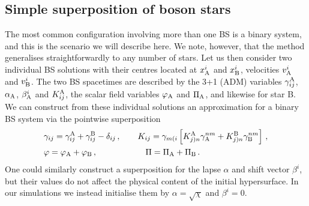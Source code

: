 \documentclass[11pt]{report}  %
\begin{document}
\subsection{Simple superposition of boson stars}
%
\label{sec:superpossimple}
The most common configuration involving more than one BS
is a binary system, and this is the scenario we will
describe here. We note, however, that the method
generalises straightforwardly to any number of stars.
Let us then consider two individual BS solutions
with their centres located at $x^i_{\rm A}$ and $x^i_{\rm B}$,
velocities $v_{\rm A}^i$ and $v_{\rm B}^i$.
The two BS spacetimes are
described by the 3+1 (ADM) variables $\gamma_{ij}^{\rm A}$,
$\alpha_{\rm A}$, $\beta_{\rm A}^i$ and $K_{ij}^{\rm A}$,
the scalar field variables $\varphi_{\rm A}$ and $\Pi_{\rm A}$,
and likewise for star B. We can construct from these
individual solutions an approximation for a binary BS system
via the pointwise superposition
%
\begin{align}
  &\gamma_{ij} =
  \gamma_{ij}^{\rm A}
  +\gamma_{ij}^{\rm B}
  -\delta_{ij}\,,~~~~~~
  K_{ij} = \gamma_{m(i}
  \left[
  K^{\rm A}_{j)n}
  \gamma_{\rm A}^{nm}
  +K^{\rm B}_{j)n}
  \gamma_{\rm B}^{nm}
  \right]\,,
  \nonumber \\
  &\varphi = \varphi_{\rm A} + \varphi_{\rm B}\,,
  \hspace{0.85cm}~~~~~~~~~~
  \Pi = \Pi_{\rm A} + \Pi_{\rm B}\,.
  \label{eq:superpossimple}
\end{align}
%
One could similarly construct a superposition for the lapse
$\alpha$ and shift vector $\beta^i$, but their values do not
affect the physical content of the initial hypersurface.
In our simulations we instead initialise them by
$\alpha=\sqrt{\chi}$ and $\beta^i=0$.
\end{document}
